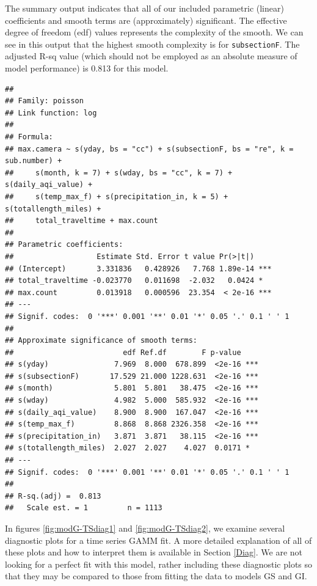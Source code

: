 \documentclass[
]{book}
\newenvironment{Shaded}{\begin{snugshade}}{\end{snugshade}}
\newcommand{\FunctionTok}[1]{\textcolor[rgb]{0.00,0.00,0.00}{#1}}
\newcommand{\NormalTok}[1]{#1}
\newcommand{\SpecialCharTok}[1]{\textcolor[rgb]{0.00,0.00,0.00}{#1}}
\begin{document}
The summary output indicates that all of our included parametric (linear) coefficients and smooth terms are (approximately) significant. The effective degree of freedom (edf) values represents the complexity of the smooth. We can see in this output that the highest smooth complexity is for \texttt{subsectionF}. The adjusted R-sq value (which should not be employed as an absolute measure of model performance) is 0.813 for this model.

\begin{Shaded}
\end{Shaded}

\begin{verbatim}
## 
## Family: poisson 
## Link function: log 
## 
## Formula:
## max.camera ~ s(yday, bs = "cc") + s(subsectionF, bs = "re", k = sub.number) + 
##     s(month, k = 7) + s(wday, bs = "cc", k = 7) + s(daily_aqi_value) + 
##     s(temp_max_f) + s(precipitation_in, k = 5) + s(totallength_miles) + 
##     total_traveltime + max.count
## 
## Parametric coefficients:
##                   Estimate Std. Error t value Pr(>|t|)    
## (Intercept)       3.331836   0.428926   7.768 1.89e-14 ***
## total_traveltime -0.023770   0.011698  -2.032   0.0424 *  
## max.count         0.013918   0.000596  23.354  < 2e-16 ***
## ---
## Signif. codes:  0 '***' 0.001 '**' 0.01 '*' 0.05 '.' 0.1 ' ' 1
## 
## Approximate significance of smooth terms:
##                         edf Ref.df        F p-value    
## s(yday)               7.969  8.000  678.899  <2e-16 ***
## s(subsectionF)       17.529 21.000 1228.631  <2e-16 ***
## s(month)              5.801  5.801   38.475  <2e-16 ***
## s(wday)               4.982  5.000  585.932  <2e-16 ***
## s(daily_aqi_value)    8.900  8.900  167.047  <2e-16 ***
## s(temp_max_f)         8.868  8.868 2326.358  <2e-16 ***
## s(precipitation_in)   3.871  3.871   38.115  <2e-16 ***
## s(totallength_miles)  2.027  2.027    4.027  0.0171 *  
## ---
## Signif. codes:  0 '***' 0.001 '**' 0.01 '*' 0.05 '.' 0.1 ' ' 1
## 
## R-sq.(adj) =  0.813   
##   Scale est. = 1         n = 1113
\end{verbatim}

In figures \ref{fig:modG-TSdiag1} and \ref{fig:modG-TSdiag2}, we examine several diagnostic plots for a time series GAMM fit. A more detailed explanation of all of these plots and how to interpret them is available in Section \ref{Diag}. We are not looking for a perfect fit with this model, rather including these diagnostic plots so that they may be compared to those from fitting the data to models GS and GI.
\end{document}

